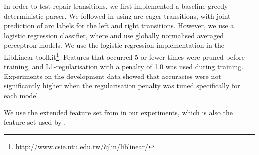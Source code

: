 \documentclass[11pt,letterpaper]{article}
\newcommand{\pp}{\textsc{pp}\xspace}
\newcommand{\pos}{\textsc{pos}\xspace}
\begin{document}
In order to test repair transitions, we first implemented a baseline greedy
deterministic parser.
We followed \citet{zhang:11} in using arc-eager transitions, with joint
prediction of arc labels for the left and right transitions.
However, we use a logistic
regression classifier, where \citet{zhang:11} and \citet{goldberg:12} use globally
normalised averaged perceptron models. We use the logistic regression
implementation in the
LibLinear toolkit\footnote{http://www.csie.ntu.edu.tw/\~cjlin/liblinear/}.
Features that occurred 5 or fewer times
were pruned before training, and L1-regularisation with a penalty of 1.0 was
used during training. Experiments on the development data showed that accuracies
were not significantly higher when the regularisation penalty was tuned
specifically for each model.

We use the extended feature set from \citet{zhang:11} in our experiments, which
is also the feature set used by \citet{goldberg:12}. 




    
\end{document}
